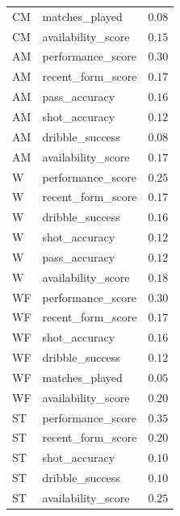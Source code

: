 \begin{small}
\begin{longtable}{|l|l|c|}
CM & matches\_played & $0.08$ \\
CM & availability\_score & $0.15$ \\
\hline
AM & performance\_score & $0.30$ \\
AM & recent\_form\_score & $0.17$ \\
AM & pass\_accuracy & $0.16$ \\
AM & shot\_accuracy & $0.12$ \\
AM & dribble\_success & $0.08$ \\
AM & availability\_score & $0.17$ \\
\hline
W  & performance\_score & $0.25$ \\
W  & recent\_form\_score & $0.17$ \\
W  & dribble\_success & $0.16$ \\
W  & shot\_accuracy & $0.12$ \\
W  & pass\_accuracy & $0.12$ \\
W  & availability\_score & $0.18$ \\
\hline
WF & performance\_score & $0.30$ \\
WF & recent\_form\_score & $0.17$ \\
WF & shot\_accuracy & $0.16$ \\
WF & dribble\_success & $0.12$ \\
WF & matches\_played & $0.05$ \\
WF & availability\_score & $0.20$ \\
\hline
ST & performance\_score & $0.35$ \\
ST & recent\_form\_score & $0.20$ \\
ST & shot\_accuracy & $0.10$ \\
ST & dribble\_success & $0.10$ \\
ST & availability\_score & $0.25$ \\
\hline
\end{longtable}
\end{small}

